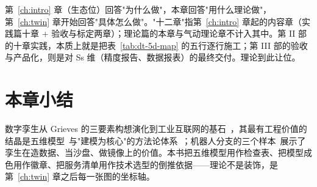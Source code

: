 第~\ref{ch:intro} 章（生态位）回答"为什么做"，本章回答"用什么理论做"，第~\ref{ch:twin} 章开始回答"具体怎么做"。"十二章"指第~\ref{ch:intro} 章起的内容章（实践篇十章 + 验收与标定两章）；理论篇的本章与气动理论章不计入其中。第 II 部的十章实践，本质上就是把表~\ref{tab:dt-5d-map} 的五行逐行施工；第 III 部的验收与产品化，则是对 Ss 维（精度报告、数据报表）的最终交付。理论到此让位。

\section*{本章小结}
数字孪生从 Grieves 的三要素构想演化到工业互联网的基石~\cite{Tao2019}，其最有工程价值的结晶是五维模型~\cite{Qi2021}与"建模为核心"的方法论体系~\cite{Tao2022}；机器人分支的三个样本~\cite{Ren2024,Cai2023,Singh2024}展示了孪生在造数据、当沙盘、做镜像上的价值。本书把五维模型用作检查表、把模型成色用作徽章、把服务清单用作技术选型的倒推依据——理论不是装饰，是第~\ref{ch:twin} 章之后每一张图的坐标轴。
